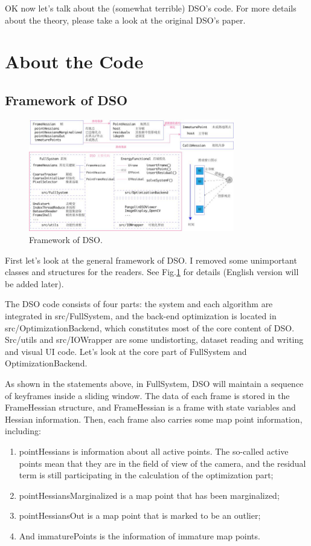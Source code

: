 \documentclass[a4paper,10pt]{article}
\begin{document}
	OK now let's talk about the (somewhat terrible) DSO's code. For more details about the theory, please take a look at the original DSO's paper.
	
	\section{About the Code}
	\subsection{Framework of DSO}
	\begin{figure}[htp]
	\centering
	\includegraphics[width=0.8\textwidth]{figs/dso-framework-cn.jpg}
	\caption{Framework of DSO.}
	\label{fig:framework-dso}
	\end{figure}
	First let's look at the general framework of DSO. I removed some unimportant classes and structures for the readers. See Fig.\ref{fig:framework-dso} for details (English version will be added later).
	
	The DSO code consists of four parts: the system and each algorithm are integrated in src/FullSystem, and the back-end optimization is located in src/OptimizationBackend, which constitutes most of the core content of DSO. Src/utils and src/IOWrapper are some undistorting, dataset reading and writing and visual UI code. Let's look at the core part of FullSystem and OptimizationBackend.
	
	As shown in the statements above, in FullSystem, DSO will maintain a sequence of keyframes inside a sliding window. The data of each frame is stored in the FrameHessian structure, and FrameHessian is a frame with state variables and Hessian information. Then, each frame also carries some map point information, including:
	\begin{enumerate}
	\item pointHessians is information about all active points. The so-called active points mean that they are in the field of view of the camera, and the residual term is still participating in the calculation of the optimization part;
	\item pointHessiansMarginalized is a map point that has been marginalized;
	\item pointHessiansOut is a map point that is marked to be an outlier;
	\item And immaturePoints is the information of immature map points.
	\end{enumerate}
	
\end{document}

